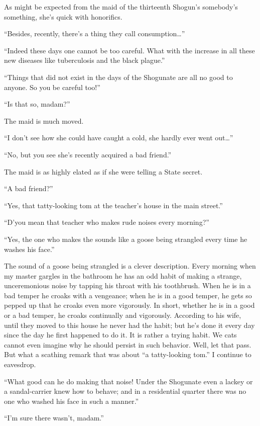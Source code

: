\documentclass[12pt, openright]{book}
\begin{document}
As might be expected from the maid of the thirteenth Shogun's somebody's
something, she's quick with honorifics.

``Besides, recently, there's a thing they call consumption\ldots{}''

``Indeed these days one cannot be too careful. What with the increase in
all these new diseases like tuberculosis and the black plague.''

``Things that did not exist in the days of the Shogunate are all no good
to anyone. So you be careful too!''

``Is that so, madam?''

The maid is much moved.

``I don't see how she could have caught a cold, she hardly ever went
out\ldots{}''

``No, but you see she's recently acquired a bad friend.''

The maid is as highly elated as if she were telling a State secret.

``A bad friend?''

``Yes, that tatty-looking tom at the teacher's house in the main
street.''

``D'you mean that teacher who makes rude noises every morning?''

``Yes, the one who makes the sounds like a goose being strangled every
time he washes his face.''

The sound of a goose being strangled is a clever description. Every
morning when my master gargles in the bathroom he has an odd habit of
making a strange, unceremonious noise by tapping his throat with his
toothbrush. When he is in a bad temper he croaks with a vengeance; when
he is in a good temper, he gets so pepped up that he croaks even more
vigorously. In short, whether he is in a good or a bad temper, he croaks
continually and vigorously. According to his wife, until they moved to
this house he never had the habit; but he's done it every day since the
day he first happened to do it. It is rather a trying habit. We cats
cannot even imagine why he should persist in such behavior. Well, let
that pass. But what a scathing remark that was about ``a tatty-looking
tom.'' I continue to eavesdrop.

``What good can he do making that noise! Under the Shogunate even a
lackey or a sandal-carrier knew how to behave; and in a residential
quarter there was no one who washed his face in such a manner.''

``I'm sure there wasn't, madam.''
\end{document}
